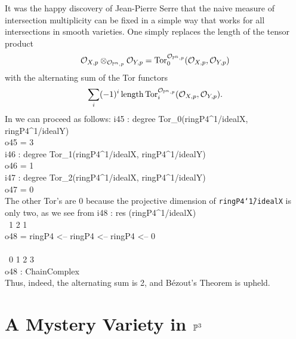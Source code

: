 It was the happy discovery
of Jean-Pierre Serre \cite[V.B.3]{Serre} that the naive 
measure of intersection multiplicity can be fixed in a simple
way that works for all intersections in smooth varieties.
One simply replaces the length of the tensor product
$$
\cO_{X,p}\otimes_{\cO_{\P^n,p}} \cO_{Y,p}=
\mathop{\rm Tor}\nolimits_0^{\cO_{{\P^n},p} }
               (\cO_{X,p}, \cO_{Y,p})
$$
with the alternating sum of the Tor functors
$$
\sum_i(-1)^i \mathop{\rm length}
\mathop{\rm Tor}\nolimits_i^{\cO_{{\P^n},p} }
               (\cO_{X,p}, \cO_{Y,p}).
$$
In \Mtwo we can proceed as follows:
\beginOutput
i45 : degree Tor_0(ringP4^1/idealX, ringP4^1/idealY)\\
\emptyLine
o45 = 3\\
\endOutput
\beginOutput
i46 : degree Tor_1(ringP4^1/idealX, ringP4^1/idealY)\\
\emptyLine
o46 = 1\\
\endOutput
\beginOutput
i47 : degree Tor_2(ringP4^1/idealX, ringP4^1/idealY)\\
\emptyLine
o47 = 0\\
\endOutput
The other Tor's are 0 because the projective
dimension of {\tt ringP4\char`\^1/idealX} is only two,
as we see from
\beginOutput
i48 : res (ringP4^1/idealX)\\
\emptyLine
\            1           2           1\\
o48 = ringP4  <-- ringP4  <-- ringP4  <-- 0\\
\                                           \\
\      0           1           2           3\\
\emptyLine
o48 : ChainComplex\\
\endOutput
Thus, indeed, the alternating sum is 2, and B\'ezout's
Theorem is upheld.

\section{A Mystery Variety in $\P^3$}

